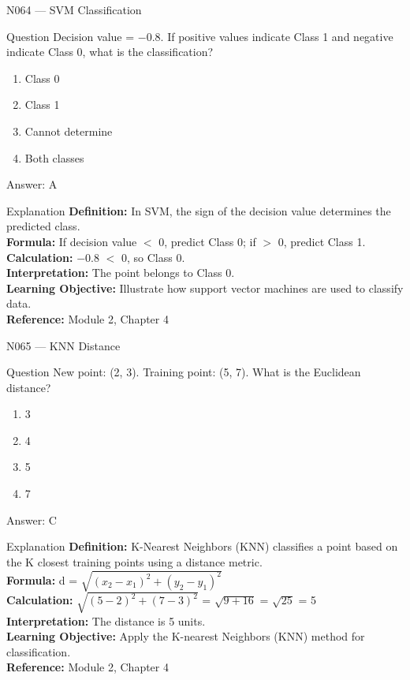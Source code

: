 \documentclass[aspectratio=169,8pt]{beamer}
\begin{document}
	\begin{frame}{N064 --- SVM Classification}
		\begin{block}{Question}
			Decision value = $-$0.8. If positive values indicate Class 1 and negative indicate Class 0, what is the classification?
			\begin{enumerate}
				\item Class 0
				\item Class 1
				\item Cannot determine
				\item Both classes
			\end{enumerate}
		\end{block}
		\begin{exampleblock}{Answer: A}\end{exampleblock}
		\begin{block}{Explanation}
			\textbf{Definition:} In SVM, the sign of the decision value determines the predicted class.\\
			\textbf{Formula:} If decision value $<$ 0, predict Class 0; if $>$ 0, predict Class 1.\\
			\textbf{Calculation:} $-$0.8 $<$ 0, so Class 0.\\
			\textbf{Interpretation:} The point belongs to Class 0.\\
			\textbf{Learning Objective:} Illustrate how support vector machines are used to classify data.\\
			\textbf{Reference:} Module 2, Chapter 4
		\end{block}
	\end{frame}
	
	\begin{frame}{N065 --- KNN Distance}
		\begin{block}{Question}
			New point: (2, 3). Training point: (5, 7). What is the Euclidean distance?
			\begin{enumerate}
				\item 3
				\item 4
				\item 5
				\item 7
			\end{enumerate}
		\end{block}
		\begin{exampleblock}{Answer: C}\end{exampleblock}
		\begin{block}{Explanation}
			\textbf{Definition:} K-Nearest Neighbors (KNN) classifies a point based on the K closest training points using a distance metric.\\
			\textbf{Formula:} d = $\sqrt{(x_{2}-x_{1})^{2} + (y_{2}-y_{1})^{2}}$\\
			\textbf{Calculation:} $\sqrt{(5-2)^{2} + (7-3)^{2}}$ = $\sqrt{9+16}$ = $\sqrt{25}$ = 5\\
			\textbf{Interpretation:} The distance is 5 units.\\
			\textbf{Learning Objective:} Apply the K-nearest Neighbors (KNN) method for classification.\\
			\textbf{Reference:} Module 2, Chapter 4
		\end{block}
	\end{frame}
	
\end{document}
